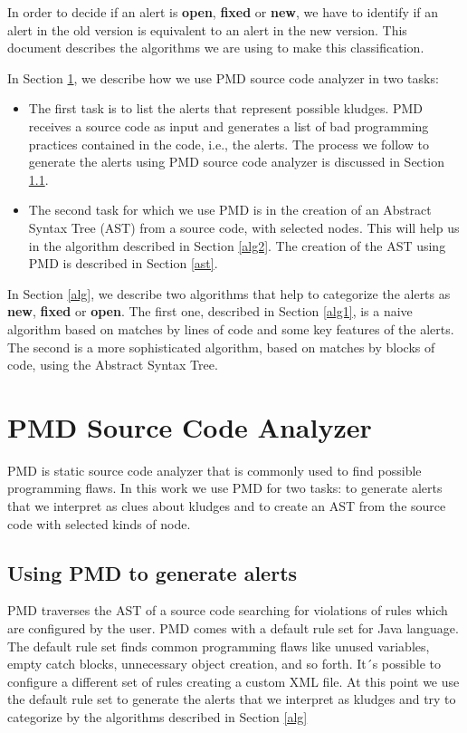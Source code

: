 \documentclass[
]{article}
\begin{document}
In order to decide if an alert is \textbf{open}, \textbf{fixed} or
\textbf{new}, we have to identify if an alert in the old version is
equivalent to an alert in the new version. This document describes the
algorithms we are using to make this classification.

In Section \ref{pmd}, we describe how we use PMD source code analyzer in
two tasks:

\begin{itemize}
\item The first task is to list the alerts that represent possible kludges. 
PMD receives a source code as input and generates a list of bad programming practices contained in the code, i.e., the alerts. 
The process we follow to generate the alerts using PMD source code analyzer is discussed in Section \ref{pmd_alerts}. 
\item The second task for which we use PMD is in the creation of an Abstract Syntax Tree (AST) from a source code, with selected nodes. 
This will help us in the algorithm described in Section \ref{alg2}. 
The creation of the AST using PMD is described in Section \ref{ast}.
\end{itemize}

In Section \ref{alg}, we describe two algorithms that help to categorize
the alerts as \textbf{new}, \textbf{fixed} or \textbf{open}. The first
one, described in Section \ref{alg1}, is a naive algorithm based on
matches by lines of code and some key features of the alerts. The second
is a more sophisticated algorithm, based on matches by blocks of code,
using the Abstract Syntax Tree.

\section{PMD Source Code Analyzer}\label{pmd}

PMD is static source code analyzer that is commonly used to find
possible programming flaws. In this work we use PMD for two tasks: to
generate alerts that we interpret as clues about kludges and to create
an AST from the source code with selected kinds of node.

\subsection{Using PMD to generate alerts}\label{pmd_alerts}

PMD traverses the AST of a source code searching for violations of rules
which are configured by the user. PMD comes with a default rule set for
Java language. The default rule set finds common programming flaws like
unused variables, empty catch blocks, unnecessary object creation, and
so forth. It´s possible to configure a different set of rules creating a
custom XML file. At this point we use the default rule set to generate
the alerts that we interpret as kludges and try to categorize by the
algorithms described in Section \ref{alg}
\end{document}
